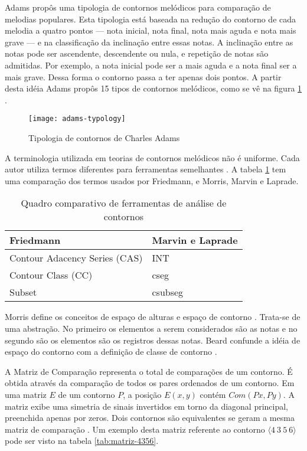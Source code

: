 \documentclass[12pt,brazil]{book}
\begin{document}
Adams propôs uma tipologia de contornos melódicos para comparação de
melodias populares. Esta tipologia está baseada na redução do contorno
de cada melodia a quatro pontos --- nota inicial, nota final, nota
mais aguda e nota mais grave --- e na classificação da inclinação
entre essas notas. A inclinação entre as notas pode ser ascendente,
descendente ou nula, e repetição de notas são admitidas. Por exemplo,
a nota inicial pode ser a mais aguda e a nota final ser a mais
grave. Dessa forma o contorno passa a ter apenas dois pontos. A partir
desta idéia Adams propôs 15 tipos de contornos melódicos, como se vê
na figura \ref{fig:adams-typology} \cite{adams76:melodic}.

\begin{figure}
  \centering
  \texttt{[image: adams-typology]}
  \caption{Tipologia de contornos de Charles Adams}
  \label{fig:adams-typology}
\end{figure}

A terminologia utilizada em teorias de contornos melódicos não é
uniforme. Cada autor utiliza termos diferentes para ferramentas
semelhantes \cite{friedmann87:response}. A tabela
\ref{tab:compara-ferramentas} tem uma comparação dos termos usados por
Friedmann, e Morris, Marvin e Laprade.

\begin{table}
  \centering
  \begin{tabular}{l|l}
    Friedmann & Marvin e Laprade \\ \hline
    Contour Adacency Series (CAS) & INT \\
    Contour Class (CC) & cseg \\
    Subset & csubseg 
  \end{tabular}
  \caption{Quadro comparativo de ferramentas de análise de contornos}
  \label{tab:compara-ferramentas}
\end{table}

Morris define os conceitos de espaço de alturas e espaço de contorno
\cite{morris87:composition}. Trata-se de uma abstração. No primeiro os
elementos a serem considerados são as notas e no segundo são os
elementos são os registros dessas notas. Beard confunde a idéia de
espaço do contorno com a definição de classe de contorno
\cite[p. 11]{beard03:contour}.

A Matriz de Comparação representa o total de comparações de um
contorno. É obtida através da comparação de todos os pares ordenados
de um contorno. Em uma matriz $E$ de um contorno $P$, a posição $E
(x,y)$ contém $Com (Px,Py)$. A matriz exibe uma simetria de sinais
invertidos em torno da diagonal principal, preenchida apenas por
zeros. Dois contornos são equivalentes se geram a mesma matriz de
comparação \cite[p. 28]{morris87:composition}. Um exemplo desta matriz
referente ao contorno $\langle 4\:3\:5\:6 \rangle$ pode ser visto na
tabela \ref{tab:matriz-4356}.
\end{document}
